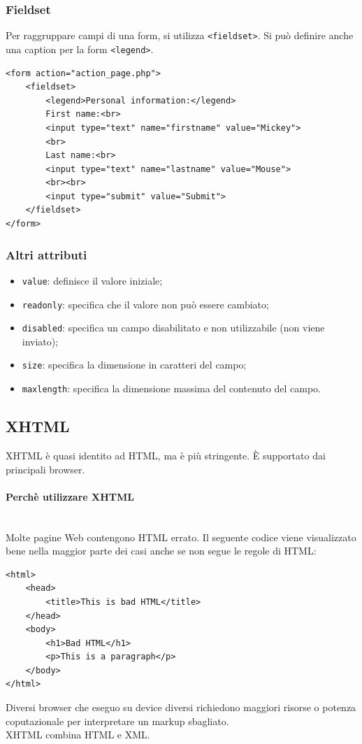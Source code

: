 \documentclass{article}
\begin{document}
\subsubsection{Fieldset}
Per raggruppare campi di una form, si utilizza \texttt{<fieldset>}. Si può definire anche una caption per la form \texttt{<legend>}.
\begin{lstlisting}[style=htmlstyle]
<form action="action_page.php">
    <fieldset>
        <legend>Personal information:</legend>
        First name:<br>
        <input type="text" name="firstname" value="Mickey">
        <br>
        Last name:<br>
        <input type="text" name="lastname" value="Mouse">
        <br><br>
        <input type="submit" value="Submit">
    </fieldset>
</form>
\end{lstlisting}
\subsubsection{Altri attributi}
\begin{itemize}
    \item \texttt{value}: definisce il valore iniziale;
    \item \texttt{readonly}: specifica che il valore non può essere cambiato;
    \item \texttt{disabled}: specifica un campo disabilitato e non utilizzabile (non viene inviato);
    \item \texttt{size}: specifica la dimensione in caratteri del campo;
    \item \texttt{maxlength}: specifica la dimensione massima del contenuto del campo.
\end{itemize}
\pagebreak
\subsection{XHTML}
XHTML è quasi identito ad HTML, ma è più stringente. È supportato dai principali browser.
\paragraph{Perchè utilizzare XHTML} \mbox{}
\\ Molte pagine Web contengono HTML errato. Il seguente codice viene visualizzato bene nella maggior parte dei casi anche 
se non segue le regole di HTML:
\begin{lstlisting}[style=htmlstyle]
<html>
    <head>
        <title>This is bad HTML</title>
    </head>
    <body>
        <h1>Bad HTML</h1>
        <p>This is a paragraph</p>
    </body>
</html>
\end{lstlisting}
Diversi browser che eseguo su device diversi richiedono maggiori risorse o potenza coputazionale per interpretare un markup sbagliato.
\\ XHTML combina HTML e XML.
\end{document}
